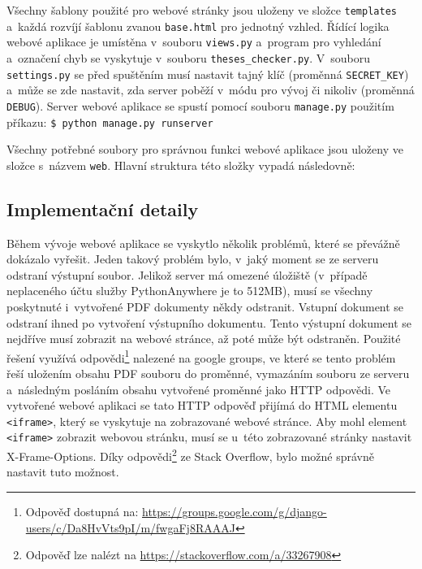 Všechny šablony použité pro webové stránky jsou uloženy ve
složce \texttt{templates} a~každá rozvíjí šablonu zvanou \texttt{base.html}
pro jednotný vzhled. Řídící logika webové aplikace je umístěna v~souboru
\texttt{views.py} a~program pro vyhledání a~označení chyb se vyskytuje 
v~souboru \texttt{theses\_checker.py}. V~souboru \texttt{settings.py}
se před spuštěním musí nastavit tajný klíč (proměnná \texttt{SECRET\_KEY}) 
a~může se zde nastavit, zda server poběží v~módu pro vývoj či nikoliv
(proměnná \texttt{DEBUG}). Server webové aplikace se spustí
pomocí souboru \texttt{manage.py} použitím
příkazu: \verb|$ python manage.py runserver|

Všechny potřebné soubory pro správnou funkci webové aplikace jsou uloženy
ve složce s~názvem \texttt{web}. Hlavní struktura této složky vypadá následovně:




\subsection*{Implementační detaily}
Během vývoje webové aplikace se vyskytlo několik problémů, které se převážně
dokázalo vyřešit. Jeden takový problém bylo, v~jaký moment se ze serveru odstraní
výstupní soubor. Jelikož server má omezené úložiště (v~případě neplaceného účtu
služby PythonAnywhere je to 512\;MB), musí se všechny poskytnuté i~vytvořené PDF
dokumenty někdy odstranit. Vstupní dokument se odstraní ihned po vytvoření
výstupního dokumentu. Tento výstupní dokument se nejdříve musí zobrazit na
webové stránce, až poté může být odstraněn. Použité řešení využívá
odpovědi\footnote{
    Odpověď dostupná na:
    \href{https://groups.google.com/g/django-users/c/Da8HvVts9pI/m/fwgaFj8RAAAJ}{https://groups.google.com/g/django-users/c/Da8HvVts9pI/m/fwgaFj8RAAAJ}
} nalezené na google groups, ve které se tento problém řeší uložením
obsahu PDF souboru do proměnné, vymazáním souboru ze serveru a~následným posláním 
obsahu vytvořené proměnné jako HTTP odpovědi. Ve vytvořené webové aplikaci se tato
HTTP odpověď přijímá do HTML elementu \texttt{<iframe>}, který se vyskytuje na
zobrazované webové stránce. Aby mohl element \texttt{<iframe>} zobrazit webovou
stránku, musí se u~této zobrazované stránky nastavit X-Frame-Options. Díky
odpovědi\footnote{
    Odpověď lze nalézt na 
    \href{https://stackoverflow.com/a/33267908}{https://stackoverflow.com/a/33267908}
} ze Stack Overflow, bylo možné správně nastavit tuto možnost. 

